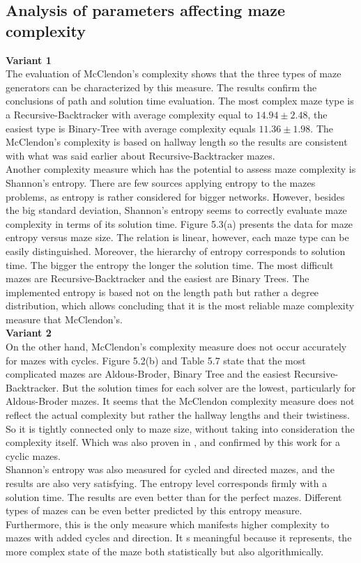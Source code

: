 \subsection{Analysis of parameters affecting maze complexity}
\textbf{Variant 1}\\
\indent The evaluation of McClendon's complexity shows that the three types of maze generators can be characterized by this measure. The results confirm the conclusions
of path and solution time evaluation. The most complex maze type is a Recursive-Backtracker with average complexity equal to $14.94 \pm 2.48$, the easiest type is 
Binary-Tree with average complexity equals $11.36 \pm 1.98$. The McClendon's complexity is based on hallway length so the results are consistent with what was said earlier about
Recursive-Backtracker mazes.\\
Another complexity measure which has the potential to assess maze complexity is Shannon's entropy. There are few sources applying entropy to the mazes problems,
as entropy is rather considered for bigger networks. However, besides the big standard deviation, Shannon's entropy seems to correctly evaluate maze complexity
in terms of its solution time. Figure 5.3(a) presents the data for maze entropy versus maze size. The relation is linear, however, each maze type can be easily distinguished.
Moreover, the hierarchy of entropy corresponds to solution time. The bigger the entropy the longer the solution time. The most difficult mazes are Recursive-Backtracker and 
the easiest are Binary Trees. The implemented entropy is based not on the length path but rather a degree distribution, which allows concluding that it is the most reliable 
maze complexity measure that McClendon's.\\
\textbf{Variant 2}\\
On the other hand, McClendon's complexity measure does not occur accurately for mazes with cycles. Figure 5.2(b) and Table 5.7 state that the most
complicated mazes are Aldous-Broder, Binary Tree and the easiest Recursive-Backtracker. But the solution times for each solver are the lowest, particularly for 
Aldous-Broder mazes. It seems that the McClendon complexity measure does not reflect the actual complexity but rather the hallway lengths and their twistiness. So it
is tightly connected only to maze size, without taking into consideration the complexity itself.
Which was also proven in \cite{4}, and confirmed by this work for a cyclic mazes.\\
Shannon's entropy was also measured for cycled and directed mazes, and the results are also very satisfying. The entropy level corresponds firmly with a solution time.
The results are even better than for the perfect mazes. Different types of mazes can be even better predicted by this entropy measure.
Furthermore, this is the only measure which manifests higher complexity to mazes with added cycles and direction. It s meaningful because it represents, the 
more complex state of the maze both statistically but also algorithmically.
